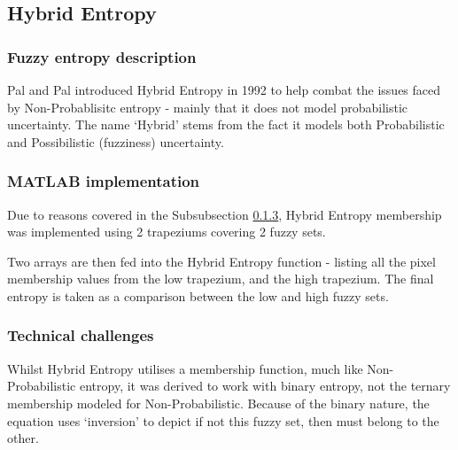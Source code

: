 \subsection{Hybrid Entropy}
\subsubsection{Fuzzy entropy description}

Pal and Pal introduced Hybrid Entropy \cite{Pal_Pal_1992} in 1992 to help combat the issues faced by Non-Probablisitc entropy - mainly that it does not model probabilistic uncertainty. The name `Hybrid' stems from the fact it models both Probabilistic and Possibilistic (fuzziness) uncertainty.


\subsubsection{MATLAB implementation}

Due to reasons covered in the Subsubsection \ref{sssec:hyrid-technical}, Hybrid Entropy membership was implemented using 2 trapeziums covering 2 fuzzy sets.

Two arrays are then fed into the Hybrid Entropy function - listing all the pixel membership values from the low trapezium, and the high trapezium. The final entropy is taken as a comparison between the low and high fuzzy sets.

\subsubsection{Technical challenges}
\label{sssec:hyrid-technical}

Whilst Hybrid Entropy utilises a membership function, much like Non-Probabilistic entropy, it was derived to work with binary entropy, not the ternary membership modeled for Non-Probabilistic. Because of the binary nature, the equation uses `inversion' to depict if not this fuzzy set, then must belong to the other.

